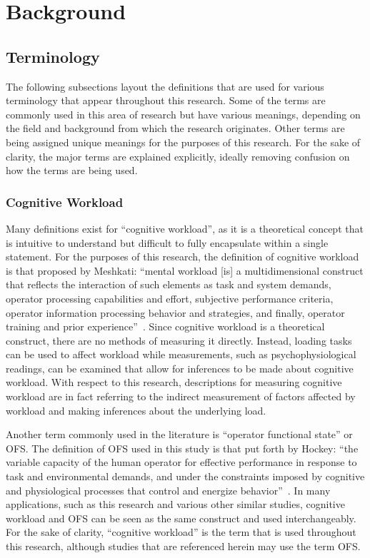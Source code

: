 \documentclass[11pt]{article}
\begin{document}
\section{Background}
	\subsection{Terminology}
	The following subsections layout the definitions that are used for various terminology that appear throughout this research. Some of the terms are commonly used in this area of research but have various meanings, depending on the field and background from which the research originates. Other terms are being assigned unique meanings for the purposes of this research. For the sake of clarity, the major terms are explained explicitly, ideally removing confusion on how the terms are being used.
	
		\subsubsection{Cognitive Workload}
		Many definitions exist for ``cognitive workload'', as it is a theoretical concept that is intuitive to understand but difficult to fully encapsulate within a single statement. For the purposes of this research, the definition of cognitive workload is that proposed by Meshkati: ``mental workload [is] a multidimensional construct that reflects the interaction of such elements as task and system demands, operator processing capabilities and effort, subjective performance criteria, operator information processing behavior and strategies, and finally, operator training and prior experience''~\cite{Meshkati}. Since cognitive workload is a theoretical construct, there are no methods of measuring it directly. Instead, loading tasks can be used to affect workload while measurements, such as psychophysiological readings, can be examined that allow for inferences to be made about cognitive workload.  With respect to this research, descriptions for measuring cognitive workload are in fact referring to the indirect measurement of factors affected by workload and making inferences about the underlying load. 
		
		Another term commonly used in the literature is ``operator functional state'' or OFS. The definition of OFS used in this study is that put forth by Hockey: ``the variable capacity of the human operator for effective performance in response to task and environmental demands, and under the constraints imposed by cognitive and physiological processes that control and energize behavior''~\cite{Hockey}. In many applications, such as this research and various other similar studies, cognitive workload and OFS can be seen as the same construct and used interchangeably. For the sake of clarity, ``cognitive workload'' is the term that is used throughout this research, although studies that are referenced herein may use the term OFS.
		
\end{document}
